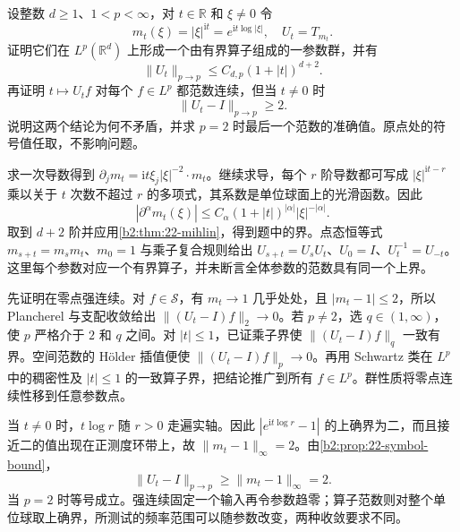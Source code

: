 \begin{exercise}\label{b2:ex:22-new-2}
设整数 \(d\geq1\)、\(1<p<\infty\)，对 \(t\in\mathbb R\) 和 \(\xi\ne0\) 令
\[
 m_t(\xi)=|\xi|^{\mathrm it}
       =e^{\mathrm it\log|\xi|},
 \quad U_t=T_{m_t}.
\]
证明它们在 \(L^p(\mathbb R^d)\) 上形成一个由有界算子组成的一参数群，并有
\[
 \|U_t\|_{p\to p}\leq C_{d,p}(1+|t|)^{d+2}.
\]
再证明 \(t\mapsto U_tf\) 对每个 \(f\in L^p\) 都范数连续，但当 \(t\ne0\) 时
\[
 \|U_t-I\|_{p\to p}\geq2.
\]
说明这两个结论为何不矛盾，并求 \(p=2\) 时最后一个范数的准确值。原点处的符号值任取，不影响问题。
\end{exercise}
\begin{solution}
求一次导数得到
\(\partial_jm_t=\mathrm it\xi_j|\xi|^{-2}\cdot m_t\)。继续求导，每个 \(r\) 阶导数都可写成 \(|\xi|^{\mathrm it-r}\) 乘以关于 \(t\) 次数不超过 \(r\) 的多项式，其系数是单位球面上的光滑函数。因此
\[
 |\partial^\alpha m_t(\xi)|
 \leq C_\alpha(1+|t|)^{|\alpha|}|\xi|^{-|\alpha|}.
\]
取到 \(d+2\) 阶并应用\cref{b2:thm:22-mihlin}，得到题中的界。点态恒等式 \(m_{s+t}=m_sm_t\)、\(m_0=1\) 与乘子复合规则给出
\(U_{s+t}=U_sU_t\)、\(U_0=I\)、\(U_t^{-1}=U_{-t}\)。这里每个参数对应一个有界算子，并未断言全体参数的范数具有同一个上界。

先证明在零点强连续。对 \(f\in\mathcal S\)，有 \(m_t\to1\) 几乎处处，且 \(|m_t-1|\leq2\)，所以 Plancherel 与支配收敛给出
\(\|(U_t-I)f\|_2\to0\)。若 \(p\ne2\)，选 \(q\in(1,\infty)\)，使 \(p\) 严格介于 \(2\) 和 \(q\) 之间。对 \(|t|\leq1\)，已证乘子界使 \(\|(U_t-I)f\|_q\) 一致有界。空间范数的 Hölder 插值便使 \(\|(U_t-I)f\|_p\to0\)。再用 Schwartz 类在 \(L^p\) 中的稠密性及 \(|t|\leq1\) 的一致算子界，把结论推广到所有 \(f\in L^p\)。群性质将零点连续性移到任意参数点。

当 \(t\ne0\) 时，\(t\log r\) 随 \(r>0\) 走遍实轴。因此 \(|e^{\mathrm it\log r}-1|\) 的上确界为二，而且接近二的值出现在正测度环带上，故
\(\|m_t-1\|_\infty=2\)。由\cref{b2:prop:22-symbol-bound}，
\[
 \|U_t-I\|_{p\to p}\geq\|m_t-1\|_\infty=2.
\]
当 \(p=2\) 时等号成立。强连续固定一个输入再令参数趋零；算子范数则对整个单位球取上确界，所测试的频率范围可以随参数改变，两种收敛要求不同。
\end{solution}

